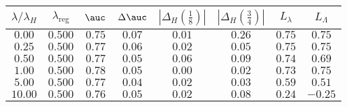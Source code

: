 \begin{tabular}{cccccccc} 
\toprule 
$\lambda / \lambda_H$ & $\lambda_\text{reg}$ & $\auc$ & $\Delta \auc$ 
& $|\Delta_H(\frac{1}{8})|$ & $|\Delta_H(\frac{3}{4})|$ & $L_\lambda$ & $L_\Lambda$ \\ 
\midrule 
$0.00$ & $0.500$ & $0.75$ & $0.07$ & $0.01$ & $0.26$ & $0.75$ & $0.75$ \\ 
$0.25$ & $0.500$ & $0.77$ & $0.06$ & $0.02$ & $0.05$ & $0.75$ & $0.75$ \\ 
$0.50$ & $0.500$ & $0.77$ & $0.05$ & $0.06$ & $0.09$ & $0.74$ & $0.69$ \\ 
$1.00$ & $0.500$ & $0.78$ & $0.05$ & $0.00$ & $0.02$ & $0.73$ & $0.75$ \\ 
$5.00$ & $0.500$ & $0.77$ & $0.04$ & $0.02$ & $0.03$ & $0.59$ & $0.51$ \\ 
$10.00$ & $0.500$ & $0.76$ & $0.05$ & $0.02$ & $0.08$ & $0.24$ & $-0.25$ \\ 
\bottomrule 
\end{tabular} 
